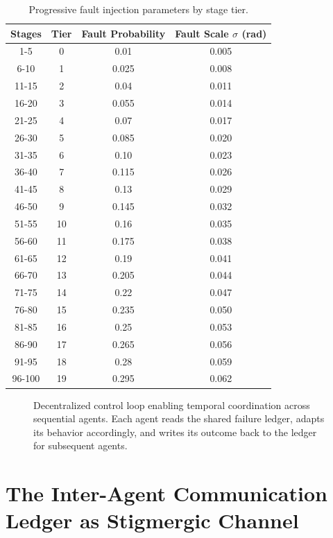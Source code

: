 \documentclass[12pt,a4paper,oneside]{report}
\begin{document}
\begin{table}[H]
\centering
\caption{Progressive fault injection parameters by stage tier.}
\label{tab:fault_tiers}
\begin{tabular}{cccc}
\toprule
\textbf{Stages} & \textbf{Tier} & \textbf{Fault Probability} & \textbf{Fault Scale $\sigma$ (rad)} \\
\midrule
1-5 & 0 & 0.01 & 0.005 \\
6-10 & 1 & 0.025 & 0.008 \\
11-15 & 2 & 0.04 & 0.011 \\
16-20 & 3 & 0.055 & 0.014 \\
21-25 & 4 & 0.07 & 0.017 \\
26-30 & 5 & 0.085 & 0.020 \\
31-35 & 6 & 0.10 & 0.023 \\
36-40 & 7 & 0.115 & 0.026 \\
41-45 & 8 & 0.13 & 0.029 \\
46-50 & 9 & 0.145 & 0.032 \\
51-55 & 10 & 0.16 & 0.035 \\
56-60 & 11 & 0.175 & 0.038 \\
61-65 & 12 & 0.19 & 0.041 \\
66-70 & 13 & 0.205 & 0.044 \\
71-75 & 14 & 0.22 & 0.047 \\
76-80 & 15 & 0.235 & 0.050 \\
81-85 & 16 & 0.25 & 0.053 \\
86-90 & 17 & 0.265 & 0.056 \\
91-95 & 18 & 0.28 & 0.059 \\
96-100 & 19 & 0.295 & 0.062 \\
\bottomrule
\end{tabular}
\end{table}

\begin{figure}[H]
    \centering
    \caption{Decentralized control loop enabling temporal coordination across sequential agents. Each agent reads the shared failure ledger, adapts its behavior accordingly, and writes its outcome back to the ledger for subsequent agents.}
    \label{fig:swarm_control_loop}
\end{figure}

\section{The Inter-Agent Communication Ledger as Stigmergic Channel}
\end{document}
